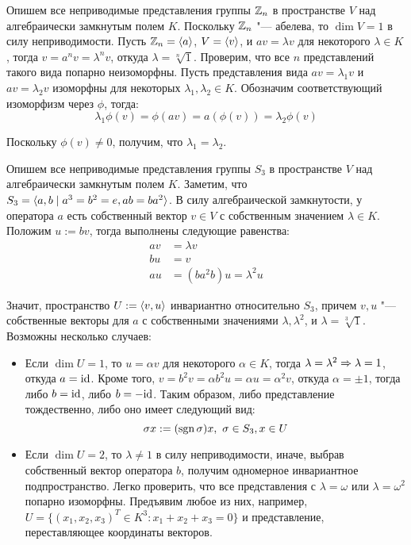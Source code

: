 \begin{example}
	Опишем все неприводимые представления группы $\mathbb{Z}_n$ в пространстве $V$ над алгебраически замкнутым полем $K$. Поскольку $\mathbb{Z}_n$ "--- абелева, то $\dim{V} = 1$ в силу неприводимости. Пусть $\mathbb{Z}_n = \langle a\rangle$, $V = \langle v \rangle$, и $av = \lambda v$ для некоторого $\lambda \in K$, тогда $v = a^nv = \lambda^n v$, откуда $\lambda = \sqrt[n]{1}$. Проверим, что все $n$ представлений такого вида попарно неизоморфны. Пусть представления вида $av = \lambda_1 v$ и $av = \lambda_2 v$ изоморфны для некоторых $\lambda_1, \lambda_2 \in K$. Обозначим соответствующий изоморфизм через $\phi$, тогда:
	\[\lambda_1\phi(v) = \phi(av) = a(\phi(v)) = \lambda_2\phi(v)\]
	
	Поскольку $\phi(v) \ne 0$, получим, что $\lambda_1 = \lambda_2$.
\end{example}

\begin{example}
	Опишем все неприводимые представления группы $S_3$ в пространстве $V$ над алгебраически замкнутым полем $K$. Заметим, что $S_3 = \langle a, b \mid a^3 = b^2 = e, ab = ba^2\rangle$. В силу алгебраической замкнутости, у оператора $a$ есть собственный вектор $v \in V$ с собственным значением $\lambda \in K$. Положим $u := bv$, тогда выполнены следующие равенства:
	\begin{align*}
		av &= \lambda v
		\\
		bu &= v
		\\
		au &= (ba^2b)u = \lambda^2u
	\end{align*}
	
	 Значит, пространство $U := \langle v, u\rangle$ инвариантно относительно $S_3$, причем $v, u$ "--- собственные векторы для $a$ с собственными значениями $\lambda, \lambda^2$, и $\lambda = \sqrt[3]{1}$. Возможны несколько случаев:
	 \begin{itemize}
	 	\item Если $\dim{U} = 1$, то $u = \alpha v$ для некоторого $\alpha \in K$, тогда $\lambda = \lambda^2 \Rightarrow \lambda = 1$, откуда $a = \mathrm{id}$. Кроме того, $v = b^2v = \alpha b^2u = \alpha u = \alpha^2 v$, откуда $\alpha = \pm 1$, тогда либо $b = \mathrm{id}$, либо $b = -\mathrm{id}$. Таким образом, либо представление тождественно, либо оно имеет следующий вид:
	 	\[\sigma x := (\operatorname{sgn}\sigma)x,~\sigma \in S_3, x \in U\]
	 	
	 	\item Если $\dim{U} = 2$, то $\lambda \ne 1$ в силу неприводимости, иначе, выбрав собственный вектор оператора $b$, получим одномерное инвариантное подпространство. Легко проверить, что все представления с $\lambda = \omega$ или $\lambda = \omega^2$ попарно изоморфны. Предъявим любое из них, например, $U = \{(x_1, x_2, x_3)^T \in K^3: x_1 + x_2 + x_3 = 0\}$ и представление, переставляющее координаты векторов.
	 \end{itemize}
\end{example}

